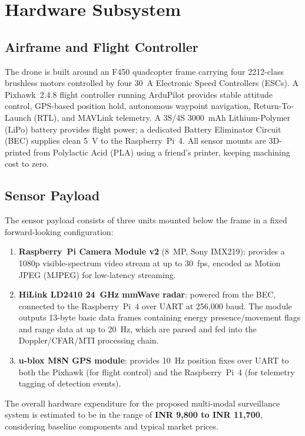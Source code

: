 \section{Hardware Subsystem}

\subsection{Airframe and Flight Controller}
The drone is built around an F450 quadcopter frame carrying four 2212-class brushless motors controlled by four 30~A Electronic Speed Controllers (ESCs). A Pixhawk~2.4.8 flight controller running ArduPilot provides stable attitude control, GPS-based position hold, autonomous waypoint navigation, Return-To-Launch (RTL), and MAVLink telemetry. A 3S/4S 3000~mAh Lithium-Polymer (LiPo) battery provides flight power; a dedicated Battery Eliminator Circuit (BEC) supplies clean 5~V to the Raspberry~Pi~4. All sensor mounts are 3D-printed from Polylactic Acid (PLA) using a friend's printer, keeping machining cost to zero.

\subsection{Sensor Payload}
The sensor payload consists of three units mounted below the frame in a fixed forward-looking configuration:
\begin{enumerate}[label=(\arabic*).]
    \item \textbf{Raspberry~Pi Camera Module v2} (8~MP, Sony IMX219): provides a 1080p visible-spectrum video stream at up to 30~fps, encoded as Motion JPEG (MJPEG) for low-latency streaming.
    \item \textbf{HiLink LD2410 24~GHz mmWave radar}: powered from the BEC, connected to the Raspberry~Pi~4 over UART at 256{,}000 baud. The module outputs 13-byte basic data frames containing energy presence/movement flags and range data at up to 20~Hz, which are parsed and fed into the Doppler/CFAR/MTI processing chain.
    \item \textbf{u-blox M8N GPS module}: provides 10~Hz position fixes over UART to both the Pixhawk (for flight control) and the Raspberry~Pi~4 (for telemetry tagging of detection events).
\end{enumerate}

The overall hardware expenditure for the proposed multi-modal surveillance system 
is estimated to be in the range of \textbf{INR 9,800 to INR 11,700}, considering 
baseline components and typical market prices.

